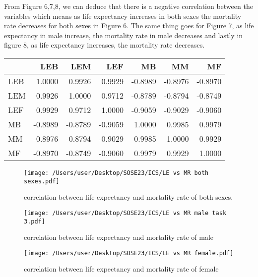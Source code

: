 \documentclass[12 pt]{scrartcl}
\begin{document}
From Figure 6,7,8, we can deduce that there is a negative correlation between the variables which means as life expectancy increases in both sexes the mortality rate decreases for both sexes in Figure 6. The same thing goes for Figure 7, as life expectancy in male increase, the mortality rate in male decreases and lastly in figure 8,  as life expectancy increases, the mortality rate decreases.

\begin{table}[ht]
\centering
{}
\label{tab:cor}
\begin{tabular}{l|rrrrrr}
& LEB     & LEM     & LEF     & MB      & MM      & MF      \\
\hline

LEB & 1.0000  & 0.9926  & 0.9929  & -0.8989 & -0.8976 & -0.8970 \\
LEM & 0.9926  & 1.0000  & 0.9712  & -0.8789 & -0.8794 & -0.8749 \\
LEF & 0.9929  & 0.9712  & 1.0000  & -0.9059 & -0.9029 & -0.9060 \\
MB  & -0.8989 & -0.8789 & -0.9059 & 1.0000  & 0.9985  & 0.9979  \\
MM  & -0.8976 & -0.8794 & -0.9029 & 0.9985  & 1.0000  & 0.9929  \\
MF  & -0.8970 & -0.8749 & -0.9060 & 0.9979  & 0.9929  & 1.0000 
\end{tabular}
\end{table}

\begin{figure}[ht]
\centering
\texttt{[image: /Users/user/Desktop/SOSE23/ICS/LE vs MR both sexes.pdf]}
\caption{correlation between life expectancy and mortality rate of both sexes.}
\label{fig:scatterplot}
\end{figure}

\begin{figure}[ht]
\centering
\texttt{[image: /Users/user/Desktop/SOSE23/ICS/LE vs MR male task 3.pdf]}
\caption{correlation between life expectancy and mortality rate of male}
\label{fig:scatterplot}
\end{figure}

\begin{figure}[ht]
\centering
\texttt{[image: /Users/user/Desktop/SOSE23/ICS/LE vs MR female.pdf]}
\caption{correlation between life expectancy and mortality rate of female}
\label{fig:scatterplot}
\end{figure}
\end{document}
